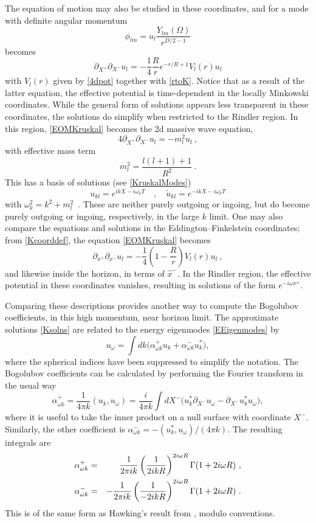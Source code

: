 \documentclass[12pt]{article}
\numberwithin{equation}{section}
\newcommand{\beq}{\begin{equation}}
\newcommand{\eeq}{\end{equation}}
\newcommand{\bea}{\begin{eqnarray}}
\newcommand{\eea}{\end{eqnarray}}
\begin{document}
The equation of motion may also be studied in these coordinates, and for a mode with definite angular momentum 
\beq
\phi_{lm} = u_l \frac{Y_{lm}(\Omega)}{r^{D/2-1}}
\eeq
becomes
\beq\label{EOMKruskal}
\partial_{X^+}\partial_{X^-}u_l = -\frac{1}{4} \frac{R}{r} e^{-r/R+1} V_l(r)u_l
\eeq
with $V_l(r)$ given by \eqref{4dpot} together with \eqref{rtoK}.  Notice that as a result of the latter equation, the effective potential is time-dependent in the locally Minkowski coordinates.  While the general form of solutions appears less transparent in these coordinates, the solutions do simplify when restricted to the Rindler region.  In this region, \eqref{EOMKruskal} becomes the 2d massive wave equation,
\beq
4\partial_{X^+}\partial_{X^-}u_l = -m_l^2 u_l\ ,
\eeq
with effective mass term
\beq
m_l^2=\frac{l(l+1)+1}{ R^2}\ .
\eeq
This has a basis of solutions (see \eqref{KruskalModes})
\beq\label{Ksolns}
u_{kl}= e^{ikX-i\omega_k T}\quad , \quad \tilde u_{kl}= e^{-ikX-i\omega_k T}
\eeq
with $\omega_k^2=k^2+m_l^2$\ .
These are neither purely outgoing or ingoing, but do become purely outgoing or ingoing, respectively, in the large $k$ limit.  
One may also compare the equations and solutions in the Eddington--Finkelstein coordinates; from \eqref{Kcoorddef}, 
the equation \eqref{EOMKruskal} becomes
\beq
\partial_{x^+}\partial_{x^-}u_l = -\frac{1}{4}\left(1-\frac{R}{r}\right) V_l(r) u_l\ ,
\eeq
and likewise inside the horizon, in terms of $\hat x^-$.  In the Rindler region, the effective potential in these coordinates vanishes, resulting in solutions of the form $e^{-i\omega x^\pm}$.

Comparing these descriptions provides another way to compute the Bogolubov coefficients, in this high momentum, near horizon limit. The approximate solutions \eqref{Ksolns} are related to the energy eigenmodes \eqref{EEigenmodes} by
\beq
u_{\omega}= \int dk \big( \alpha^+_{\omega k} u_{k}+\alpha^-_{\omega k}u_{k}^*\big) ,
\eeq
where the spherical indices have been suppressed to simplify the notation. The Bogolubov coefficients can be calculated by performing the Fourier transform in the usual way
\beq
\alpha^+_{\omega k}=\frac{1}{4\pi k} (u_k,u_\omega) = \frac{i}{4\pi k} \int dX^- \big(u_{k}^*\partial_{X^-}u_\omega - \partial_{X^-}u_{k}^* u_\omega \big),
\eeq
where it is useful to take the inner product on a null surface with coordinate $X^-$. Similarly, the other coefficient is $\alpha^-_{\omega k}=-(u_k^*,u_\omega)/(4\pi k)$. The resulting integrals are
\bea
\alpha^+_{\omega k}&=&\frac{1}{2\pi i k} \left(\frac{1}{2ikR}\right)^{2i\omega R}\Gamma(1+2 i \omega R)\ ,\cr
\alpha^-_{\omega k}&=&-\frac{1}{2\pi i k}\left(\frac{1}{-2ikR}\right)^{2i\omega R}\Gamma(1+2 i \omega R)\ .
\eea 
This is of the same form as  Hawking's result from \cite{Hawk}, modulo conventions.




{}
\end{document}
